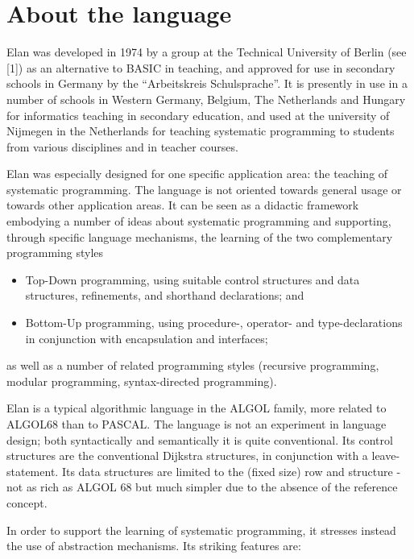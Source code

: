 \section*{About the language}

Elan was developed in 1974 by a group at the Technical University
of Berlin (see [1]) as an alternative to BASIC in teaching,
and approved for use in secondary schools in Germany by the
``Arbeitskreis Schulsprache''.
It is presently in use in a number of schools in Western Germany,
Belgium, The Netherlands and Hungary for informatics teaching in secondary
education, and used at the university of Nijmegen in the Netherlands
for teaching systematic programming to students from various disciplines
and in teacher courses.

Elan was especially designed for one specific application area:
the teaching of systematic programming. The language is not
oriented towards general usage or towards other application areas.
It can be seen as a didactic framework embodying a number of ideas
about systematic programming and supporting, through specific
language mechanisms, the learning of the two complementary programming
styles

\begin{itemize}
\item Top-Down programming, using suitable control structures
and data structures, refinements, and shorthand declarations; and
\item Bottom-Up programming, using procedure-, operator- and
type-declarations in conjunction with encapsulation and interfaces;
\end{itemize}

\noindent
as well as a number of related programming styles (recursive
programming, modular programming, syntax-directed programming).

Elan is a typical algorithmic language in the ALGOL family,
more related to ALGOL68 than to PASCAL.
The language is not an experiment in language design; both 
syntactically and semantically it is quite conventional.
Its control structures are the conventional Dijkstra structures,
in conjunction with a leave-statement. Its data structures are limited
to the (fixed size) row and structure - not as rich as ALGOL 68
but much simpler due to the absence of the reference concept.

In order to support the learning of systematic programming, it stresses
instead the use of abstraction mechanisms.
Its striking features are:

